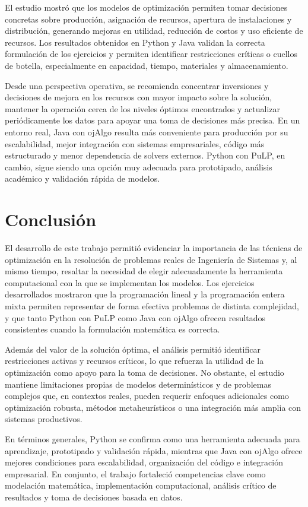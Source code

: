\documentclass[12pt,letterpaper]{article}
\begin{document}
El estudio mostró que los modelos de optimización permiten tomar decisiones concretas sobre producción, asignación de recursos, apertura de instalaciones y distribución, generando mejoras en utilidad, reducción de costos y uso eficiente de recursos. Los resultados obtenidos en Python y Java validan la correcta formulación de los ejercicios y permiten identificar restricciones críticas o cuellos de botella, especialmente en capacidad, tiempo, materiales y almacenamiento.

Desde una perspectiva operativa, se recomienda concentrar inversiones y decisiones de mejora en los recursos con mayor impacto sobre la solución, mantener la operación cerca de los niveles óptimos encontrados y actualizar periódicamente los datos para apoyar una toma de decisiones más precisa. En un entorno real, Java con ojAlgo resulta más conveniente para producción por su escalabilidad, mejor integración con sistemas empresariales, código más estructurado y menor dependencia de solvers externos. Python con PuLP, en cambio, sigue siendo una opción muy adecuada para prototipado, análisis académico y validación rápida de modelos.

\section{Conclusión}

El desarrollo de este trabajo permitió evidenciar la importancia de las técnicas de optimización en la resolución de problemas reales de Ingeniería de Sistemas y, al mismo tiempo, resaltar la necesidad de elegir adecuadamente la herramienta computacional con la que se implementan los modelos. Los ejercicios desarrollados mostraron que la programación lineal y la programación entera mixta permiten representar de forma efectiva problemas de distinta complejidad, y que tanto Python con PuLP como Java con ojAlgo ofrecen resultados consistentes cuando la formulación matemática es correcta.

Además del valor de la solución óptima, el análisis permitió identificar restricciones activas y recursos críticos, lo que refuerza la utilidad de la optimización como apoyo para la toma de decisiones. No obstante, el estudio mantiene limitaciones propias de modelos determinísticos y de problemas complejos que, en contextos reales, pueden requerir enfoques adicionales como optimización robusta, métodos metaheurísticos o una integración más amplia con sistemas productivos.

En términos generales, Python se confirma como una herramienta adecuada para aprendizaje, prototipado y validación rápida, mientras que Java con ojAlgo ofrece mejores condiciones para escalabilidad, organización del código e integración empresarial. En conjunto, el trabajo fortaleció competencias clave como modelación matemática, implementación computacional, análisis crítico de resultados y toma de decisiones basada en datos.
\end{document}
